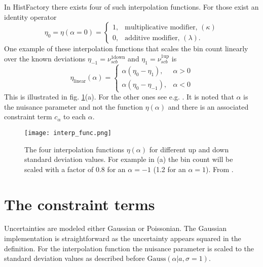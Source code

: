 In HistFactory there exists four of such interpolation functions. For those exist an identity operator 
\begin{equation}
    \eta_0=\eta (\alpha=0) =
    \begin{cases}
        1 ,& \text{multiplicative modifier, } (\kappa) \\
        0 ,& \text{additive modifier, } (\lambda).
    \end{cases}
\end{equation}
One example of these interpolation functions that scales the bin count linearly over the known deviations $\eta_{-1}=\nu_{scb}^\mathrm{1down}$ and $\eta_{1}=\nu_{scb}^\mathrm{1up}$ is
\begin{equation}
    \eta_\mathrm{linear}(\alpha)=
    \begin{cases}
        \alpha(\eta_0 - \eta_1) ,& \alpha>0\\
        \alpha(\eta_0 - \eta_{-1}) ,& \alpha<0
    \end{cases}
\end{equation}
This is illustrated in fig. \ref{fig:interp_func}(a). For the other ones see e.g. \citep{heinrich2019searches}. It is noted that $\alpha$ is the nuisance parameter and not the function $\eta(\alpha)$ and there is an associated constraint term $c_\alpha$ to each $\alpha$.
\begin{figure}
    \centering
    \texttt{[image: interp\_func.png]}
        \caption[]{The four interpolation functions $\eta(\alpha)$ for different up and down standard deviation values. For example in (a) the bin count will be scaled with a factor of 0.8 for an $\alpha=-1$ (1.2 for an $\alpha=1$). From \citep{cranmer2012histfactory}.}
    \label{fig:interp_func}    
\end{figure}

\section{The constraint terms}\label{sec:constraint_terms}
Uncertainties are modeled either Gaussian or Poissonian. The Gaussian implementation is straightforward as the uncertainty appears squared in the definition. For the interpolation function the nuisance parameter is scaled to the standard deviation values as described before $\mathrm{Gauss}(\alpha | a, \sigma=1)$. 

